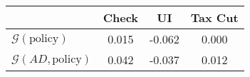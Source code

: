 \begin{tabular}{@{}lccc@{}} 
\toprule 
                          & Check      & UI    & Tax Cut    \\  \midrule 
$\mathcal{G}(\text{policy})$ & 0.015  & -0.062  & 0.000     \\ 
$\mathcal{G}(AD,\text{policy})$ & 0.042  & -0.037  & 0.012     \\ 
\end{tabular}  
